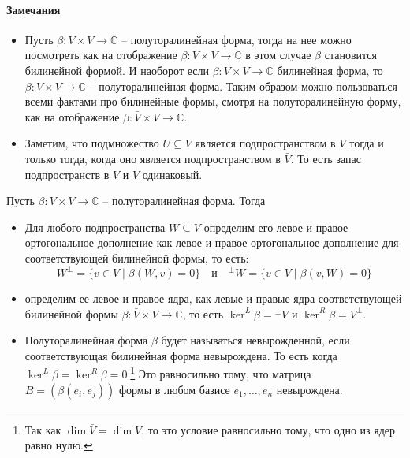 \paragraph{Замечания}
\begin{itemize}
\item Пусть $\beta\colon V\times V\to \mathbb C$ -- полуторалинейная форма, тогда на нее можно посмотреть как на отображение $\beta\colon \bar V\times V\to \mathbb C$ в этом случае $\beta$ становится билинейной формой. И наоборот если $\beta\colon \bar V\times V\to \mathbb C$ билинейная форма, то $\beta\colon V\times V\to \mathbb C$ -- полуторалинейная форма. Таким образом можно пользоваться всеми фактами про билинейные формы, смотря на полуторалинейную форму, как на отображение $\beta\colon \bar V\times V\to \mathbb C$.

\item Заметим, что подмножество $U\subseteq V$ является подпространством в $V$ тогда и только тогда, когда оно является подпространством в $\bar V$. То есть запас подпространств в $V$ и $\bar V$ одинаковый.
\end{itemize}

\begin{definition}
Пусть $\beta\colon V\times V\to \mathbb C$ -- полуторалинейная форма. Тогда
\begin{itemize}
\item Для любого подпространства $W\subseteq V$ определим его левое и правое ортогональное дополнение как левое и правое ортогональное дополнение для соответствующей билинейной формы, то есть:
\[
W^\bot = \{v\in V\mid \beta(W,v) = 0\}\quad \text{и} \quad {}^\bot W = \{v\in V\mid \beta(v, W) = 0\}
\]
\item  определим ее левое и правое ядра, как левые и правые ядра соответствующей билинейной формы $\beta\colon \bar V\times V\to \mathbb C$, то есть $\ker^L \beta= {}^\bot V$ и $\ker^R \beta = V^\bot$.

\item Полуторалинейная форма $\beta$ будет называться невырожденной, если соответствующая билинейная форма невырождена. То есть когда $\ker^L\beta = \ker ^R\beta = 0$.\footnote{Так как $\dim \bar V = \dim V$, то это условие равносильно тому, что одно из ядер равно нулю.} Это равносильно тому, что матрица $B = (\beta(e_i, e_j))$ формы в любом базисе $e_1,\ldots,e_n$ невырождена.
\end{itemize}
 
\end{definition}

